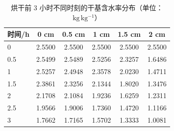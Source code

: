 \begin{table}[htbp]
\centering
\caption{烘干前 3 小时不同时刻的干基含水率分布（单位：$\mathrm{kg\,kg^{-1}}$）}
\label{tab:t4}
\begin{tabular}{lccccc}
\toprule
时间/h & 0 cm & 0.5 cm & 1 cm & 1.5 cm & 2 cm \\
\midrule
0 & 2.5500 & 2.5500 & 2.5500 & 2.5500 & 2.5500 \\
0.5 & 2.5499 & 2.5489 & 2.5256 & 2.3257 & 1.6486 \\
1 & 2.5257 & 2.4948 & 2.3578 & 2.0230 & 1.4711 \\
1.5 & 2.3861 & 2.3256 & 2.1344 & 1.8020 & 1.3476 \\
2 & 2.1708 & 2.1084 & 1.9236 & 1.6259 & 1.2311 \\
2.5 & 1.9566 & 1.9006 & 1.7360 & 1.4720 & 1.1166 \\
3 & 1.7662 & 1.7165 & 1.5702 & 1.3333 & 1.0081 \\
\bottomrule
\end{tabular}
\end{table}
